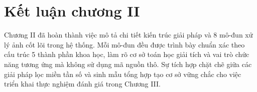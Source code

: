 \section{Kết luận chương II}

Chương II đã hoàn thành việc mô tả chi tiết kiến trúc giải pháp và 8 mô-đun xử lý ảnh cốt lõi trong hệ thống. Mỗi mô-đun đều được trình bày chuẩn xác theo cấu trúc 5 thành phần khoa học, làm rõ cơ sở toán học giải tích và vai trò chức năng tương ứng mà không sử dụng mã nguồn thô. Sự tích hợp chặt chẽ giữa các giải pháp lọc miền tần số và sinh mẫu tổng hợp tạo cơ sở vững chắc cho việc triển khai thực nghiệm đánh giá trong Chương III.
